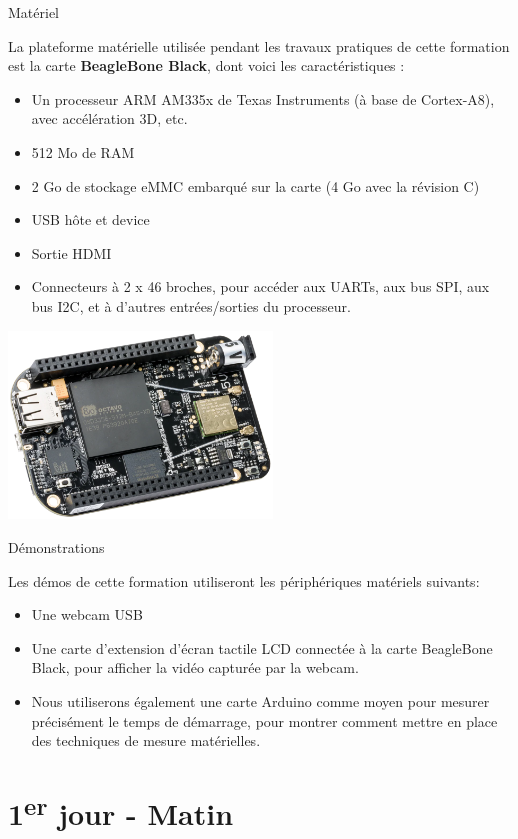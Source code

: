 \documentclass[a4paper,12pt,obeyspaces,spaces,hyphens]{article}
\begin{document}
\feagendatwocolumn
{Matériel}
{
  La plateforme matérielle utilisée pendant les travaux pratiques de
  cette formation est la carte {\bf BeagleBone Black}, dont voici les
  caractéristiques :

  \begin{itemize}
  \item Un processeur ARM AM335x de Texas Instruments (à base de
    Cortex-A8), avec accélération 3D, etc.
  \item 512 Mo de RAM
  \item 2 Go de stockage eMMC embarqué sur la carte
	\newline(4 Go avec la révision C)
  \item USB hôte et device
  \item Sortie HDMI
  \item Connecteurs à 2 x 46 broches, pour accéder aux UARTs, aux
        bus SPI, aux bus I2C, et à d'autres entrées/sorties du
        processeur.
  \end{itemize}
}
{}
{
  \begin{center}
    \includegraphics[height=5cm]{../slides/beagleboneblack-board/beagleboneblack.png}
  \end{center}
}

\feagendaonecolumn
{Démonstrations}
{
  Les démos de cette formation utiliseront les périphériques matériels suivants:

  \begin{itemize}
  \item Une webcam USB
  \item Une carte d'extension d'écran tactile LCD connectée à la carte
    BeagleBone Black, pour afficher la vidéo capturée par la webcam.
  \item Nous utiliserons également une carte Arduino comme moyen pour mesurer
    précisément le temps de démarrage, pour montrer comment mettre en place
    des techniques de mesure matérielles.
  \end{itemize}
}

\section{1\textsuperscript{er} jour - Matin}
\end{document}
